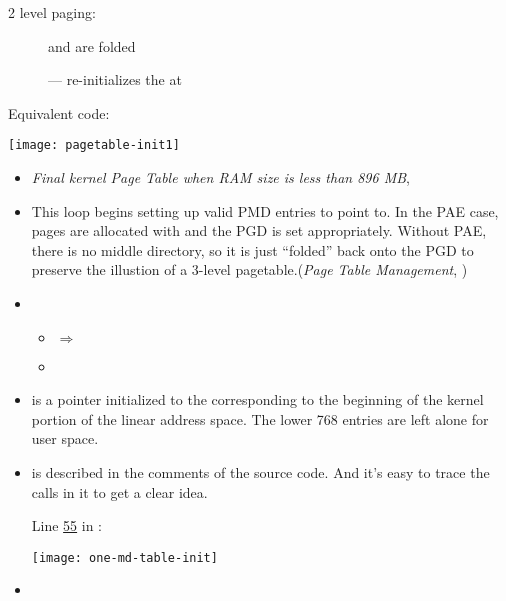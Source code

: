 \begin{frame}
  \begin{description}
  \item[2 level paging:]  and  are folded
  \end{description}
  \begin{center}
     
  \end{center}
  \begin{description}
  \item[] --- re-initializes the  at
  \item[Equivalent code:] 
  \end{description}  
  \begin{center}
    \texttt{[image: pagetable-init1]}
  \end{center}
\end{frame}

\begin{itemize}
\item \emph{Final kernel Page Table when RAM size is less than 896 MB},
  \cite[Sec 2.5.5.2]{bovet2005understanding}
\item This loop begins setting up valid PMD entries to point to. In the PAE case, pages
  are allocated with  and the PGD is set
  appropriately. Without PAE, there is no middle directory, so it is just “folded” back
  onto the PGD to preserve the illustion of a 3-level pagetable.(\emph{Page Table
    Management}, \cite[Appendix C, p224]{gorman2004understanding})
\item {}
  \begin{itemize}
  \item {} $\Rightarrow{}$
  \item {}
  \end{itemize}
\item {} is a pointer initialized to the  corresponding to the
  beginning of the kernel portion of the linear address space. The lower 768 entries are
  left alone for user space.
\item {} is described in the comments of the source code. And it's
  easy to trace the calls in it to get a clear idea.

  Line \href{http://lxr.linux.no/linux+v2.6.11/arch/i386/mm/init.c#L55}{55} in :
  \begin{center}
    \texttt{[image: one-md-table-init]}
  \end{center}
\item {}
\end{itemize}

